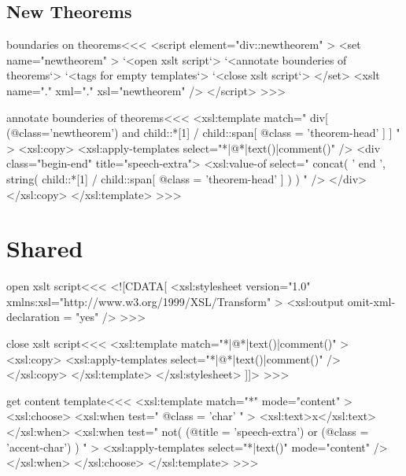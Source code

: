\documentclass{article}
\begin{document}
\subsection{New Theorems}

\<boundaries on theorems\><<<
<script element="div::newtheorem" >
  <set name="newtheorem" >
     `<open xslt script`>
     `<annotate bounderies of theorems`> 
     `<tags for empty templates`>
     `<close xslt script`>
  </set>
  <xslt name="." xml="." xsl="newtheorem" />
</script> 
>>>


\<annotate bounderies of theorems\><<<
<xsl:template match=" 
    div[   (@class='newtheorem') 
         and
           child::*[1] / child::span[ @class = 'theorem-head' ]
    ]
" >
   <xsl:copy>
     <xsl:apply-templates select="*|@*|text()|comment()" />
     <div class="begin-end" title="speech-extra"> 
        <xsl:value-of select=" 
           concat( ' end ',
                   string( child::*[1] / 
                           child::span[ @class = 'theorem-head' ] )
           ) " />
     </div>
   </xsl:copy>
</xsl:template> 
>>>









\section{Shared}



\<open xslt script\><<<
<![CDATA[ 
   <xsl:stylesheet version="1.0"
      xmlns:xsl="http://www.w3.org/1999/XSL/Transform"
   >
      <xsl:output omit-xml-declaration = "yes" />
>>>

\<close xslt script\><<<
      <xsl:template match="*|@*|text()|comment()" >
        <xsl:copy>
          <xsl:apply-templates select="*|@*|text()|comment()" />
        </xsl:copy>
      </xsl:template>
   </xsl:stylesheet> 
]]>
>>>


\<get content template\><<<
<xsl:template match="*" mode="content" >
  <xsl:choose>
     <xsl:when test=" @class = 'char' " >   
       <xsl:text>x</xsl:text>
     </xsl:when>
     <xsl:when test=" not( 
            (@title = 'speech-extra') or (@class = 'accent-char')
         ) " >
       <xsl:apply-templates select="*|text()" mode="content" />
     </xsl:when>
  </xsl:choose>
</xsl:template> 
>>>


\end{document}
